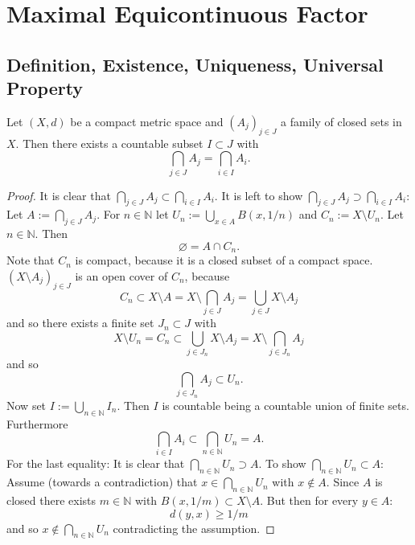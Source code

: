 \section{Maximal Equicontinuous Factor}
\subsection{Definition, Existence, Uniqueness, Universal Property}
\begin{lemma}
  \label{lem:countableSubIntersection}
  Let $(X,d)$ be a compact metric space and $(A_j)_{j \in J}$ a family of closed sets in $X$.
  Then there exists a countable subset $I \subset J$ with
  \begin{equation*}
    \bigcap_{j \in J} A_j = \bigcap_{i \in I} A_{i}.
  \end{equation*}
\end{lemma}
\begin{proof}

  It is clear that $\bigcap_{j \in J} A_j \subset \bigcap_{i \in I} A_{i}$.
  It is left to show $\bigcap_{j \in J} A_j \supset \bigcap_{i \in I} A_{i}$:
Let $A:=\bigcap_{j \in J} A_j$.
  For $n \in \mathbb{N}$ let $U_n := \bigcup_{ x \in A} B(x, 1/n)$ and $C_n := X \setminus U_n$.
  Let $n \in \mathbb{N}$. Then
  \begin{equation*}
    \varnothing =  A \cap C_n.
  \end{equation*}
  Note that $C_n$ is compact, because it is a closed subset of a compact space.
  $(X \setminus A_j)_{j \in J}$ is an open cover of $C_n$,
  because
  \begin{equation*}
    C_n \subset X \setminus A = X \setminus \bigcap_{j \in J} A_j = \bigcup_{j \in J} X \setminus A_j
  \end{equation*}
  and so there exists a finite set $J_n \subset J$ with
  \begin{equation*}
    X \setminus U_n = C_n \subset \bigcup_{j \in J_n} X \setminus A_j = X \setminus \bigcap_{j \in J_n} A_j
  \end{equation*}
  and so
  \begin{equation*}
 \bigcap_{j \in J_n} A_j \subset U_n.
  \end{equation*}
  Now set $I := \bigcup_{n \in \mathbb{N}} I_n$.
  Then $I$ is countable being a countable union of finite sets.
  Furthermore
  \begin{equation*}
    \bigcap_{i \in I} A_i \subset \bigcap_{n \in \mathbb{N}} U_n = A.
  \end{equation*}
  For the last equality: It is clear that $\bigcap_{n \in \mathbb{N}} U_n \supset A$.
  To show $\bigcap_{n \in \mathbb{N}}U_n \subset A$:
  Assume (towards a contradiction) that $x \in \bigcap_{n \in \mathbb{N}}U_n $ with $x \notin A$.
  Since $A$ is closed there exists $m \in \mathbb{N}$ with $B(x,1/m) \subset X \setminus A$.
  But then for every $y \in A$:
  \begin{equation*}
    d(y,x) \geq 1/m
  \end{equation*}
  and so $x \notin \bigcap_{n \in \mathbb{N}}U_n$ contradicting the assumption.
\end{proof}
